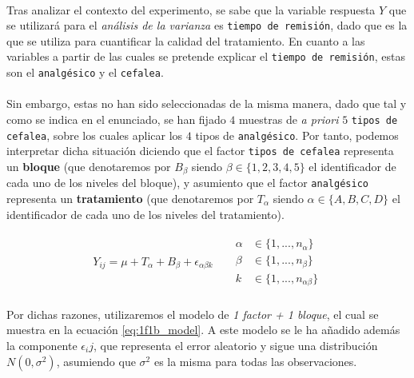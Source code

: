 \documentclass[11pt]{article}
\begin{document}
      \paragraph{}
      Tras analizar el contexto del experimento, se sabe que la variable respuesta $Y$ que se utilizará para el \emph{análisis de la varianza} es \texttt{tiempo de remisión}, dado que es la que se utiliza para cuantificar la calidad del tratamiento. En cuanto a las variables a partir de las cuales se pretende explicar el \texttt{tiempo de remisión}, estas son el \texttt{analgésico} y el \texttt{cefalea}.

      \paragraph{}
      Sin embargo, estas no han sido seleccionadas de la misma manera, dado que tal y como se indica en el enunciado, se han fijado $4$ muestras de \emph{a priori} $5$ \texttt{tipos de cefalea}, sobre los cuales aplicar los $4$ tipos de \texttt{analgésico}. Por tanto, podemos interpretar dicha situación diciendo que el factor \texttt{tipos de cefalea} representa un \textbf{bloque} (que denotaremos por $B_\beta$ siendo $\beta \in \{1,2,3,4,5\}$ el identificador de cada uno de los niveles del bloque), y asumiento que el factor \texttt{analgésico} representa un \textbf{tratamiento} (que denotaremos por $T_\alpha $ siendo $\alpha \in \{A, B, C, D\}$ el identificador de cada uno de los niveles del tratamiento).

      \begin{align}
      \label{eq:1f1b_model}
        Y_{ij} = \mu + T_\alpha + B_\beta + \epsilon_{\alpha \beta k} &&
        \begin{split}
          \alpha &\in \{1,...,n_\alpha \} \\
          \beta &\in \{1, ..., n_\beta \} \\
          k &\in \{1,...,  n_{\alpha\beta} \}
        \end{split}
      \end{align}

      \paragraph{}
      Por dichas razones, utilizaremos el modelo de \emph{1 factor + 1 bloque}, el cual se muestra en la ecuación \eqref{eq:1f1b_model}. A este modelo se le ha añadido además la componente $\epsilon_ij$, que representa el error aleatorio y sigue una distribución $N(0, \sigma^2)$, asumiendo que $\sigma^2$ es la misma para todas las observaciones.
\end{document}
